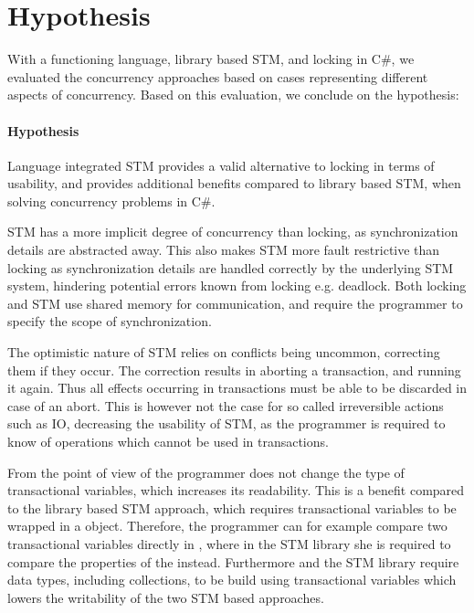 \section{Hypothesis}
With a functioning \stmname language, library based \ac{STM}, and locking in C\#, we evaluated the concurrency approaches based on cases representing different aspects of concurrency. Based on this evaluation, we conclude on the hypothesis: 

\paragraph{Hypothesis} Language integrated \ac{STM} provides a valid alternative to locking in terms of usability, and provides additional benefits compared to library based \ac{STM}, when solving concurrency problems in C\#. 

\ac{STM} has a more implicit degree of concurrency than locking, as synchronization details are abstracted away. This also makes \ac{STM} more fault restrictive than locking as synchronization details are handled correctly by the underlying \ac{STM} system, hindering potential errors known from locking e.g. deadlock. Both locking and \ac{STM} use shared memory for communication, and require the programmer to specify the scope of synchronization.

The optimistic nature of \ac{STM} relies on conflicts being uncommon,  correcting them if they occur. The correction results in aborting a transaction, and running it again. Thus all effects occurring in transactions must be able to be discarded in case of an abort. This is however not the case for so called irreversible actions such as \ac{IO},  decreasing the usability of \ac{STM}, as the programmer is required to know of operations which cannot be used in transactions.

From the point of view of the programmer \stmname does not change the type of transactional variables, which increases its readability. This is a benefit compared to the library based \ac{STM} approach, which requires transactional variables to be wrapped in a  object. Therefore, the programmer can for example compare two transactional variables directly in \stmname, where in the \ac{STM} library she is required to compare the  properties of the  instead. Furthermore \stmname and the \ac{STM} library require data types, including collections, to be build using transactional variables which lowers the writability of the two \ac{STM} based approaches.  %


